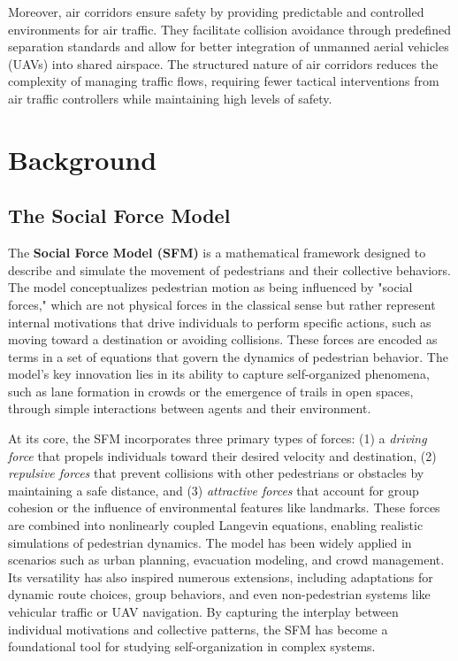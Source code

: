 \documentclass[letterpaper,11pt]{article}
\begin{document}
Moreover, air corridors ensure safety by providing predictable and controlled environments for air traffic. They facilitate collision avoidance through predefined separation standards and allow for better integration of unmanned aerial vehicles (UAVs) into shared airspace. The structured nature of air corridors reduces the complexity of managing traffic flows, requiring fewer tactical interventions from air traffic controllers while maintaining high levels of safety. %

\section{Background}

\subsection{The Social Force Model}
The \textbf{Social Force Model (SFM)} %
is a mathematical framework designed to describe and simulate the movement of pedestrians and their collective behaviors. The model conceptualizes pedestrian motion as being influenced by "social forces," which are not physical forces in the classical sense but rather represent internal motivations that drive individuals to perform specific actions, such as moving toward a destination or avoiding collisions. These forces are encoded as terms in a set of equations that govern the dynamics of pedestrian behavior. The model's key innovation lies in its ability to capture self-organized phenomena, such as lane formation in crowds or the emergence of trails in open spaces, through simple interactions between agents and their environment.

At its core, the SFM incorporates three primary types of forces: (1) a \textit{driving force} that propels individuals toward their desired velocity and destination, (2) \textit{repulsive forces} that prevent collisions with other pedestrians or obstacles by maintaining a safe distance, and (3) \textit{attractive forces} that account for group cohesion or the influence of environmental features like landmarks. These forces are combined into nonlinearly coupled Langevin equations, enabling realistic simulations of pedestrian dynamics. The model has been widely applied in scenarios such as urban planning, evacuation modeling, and crowd management. Its versatility has also inspired numerous extensions, including adaptations for dynamic route choices, group behaviors, and even non-pedestrian systems like vehicular traffic or UAV navigation. By capturing the interplay between individual motivations and collective patterns, the SFM has become a foundational tool for studying self-organization in complex systems.
\end{document}
